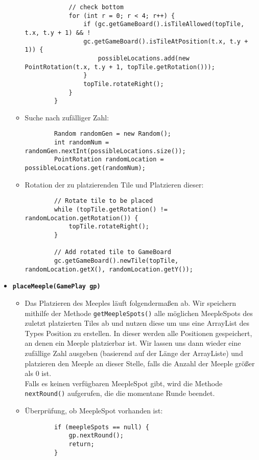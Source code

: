 \begin{itemize}
\begin{itemize}
\begin{lstlisting}
			// check bottom
			for (int r = 0; r < 4; r++) {
				if (gc.getGameBoard().isTileAllowed(topTile, t.x, t.y + 1) && !
				gc.getGameBoard().isTileAtPosition(t.x, t.y + 1)) {
					possibleLocations.add(new PointRotation(t.x, t.y + 1, topTile.getRotation()));
				}
				topTile.rotateRight();
			}
		}
	\end{lstlisting}
	
	\item Suche nach zufälliger Zahl:
	\begin{lstlisting}
		Random randomGen = new Random();
		int randomNum = randomGen.nextInt(possibleLocations.size());
		PointRotation randomLocation = possibleLocations.get(randomNum);
	\end{lstlisting}	
	
	\clearpage	
	
	\item Rotation der zu platzierenden Tile und Platzieren dieser:
	\begin{lstlisting}
		// Rotate tile to be placed
		while (topTile.getRotation() != randomLocation.getRotation()) {
			topTile.rotateRight();
		}
		
		// Add rotated tile to GameBoard
		gc.getGameBoard().newTile(topTile, randomLocation.getX(), randomLocation.getY());
	\end{lstlisting}
	
	\end{itemize}
\item \textbf{\texttt{placeMeeple(GamePlay gp)}}
	\begin{itemize}
	
	\item[]
			Das Platzieren des Meeples läuft folgendermaßen ab. Wir speichern mithilfe der Methode 
			\texttt{getMeepleSpots()} alle möglichen MeepleSpots des zuletzt platzierten Tiles ab und nutzen 
			diese um uns eine ArrayList des Types Position zu erstellen. In dieser werden alle Positionen
			gespeichert, an denen ein Meeple platzierbar ist. Wir lassen uns dann wieder eine zufällige Zahl
			ausgeben (basierend auf der Länge der ArrayListe) und platzieren den Meeple an dieser Stelle,
			falls die Anzahl der Meeple größer als 0 ist. \\
			Falls es keinen verfügbaren MeepleSpot gibt, wird die Methode \texttt{nextRound()} aufgerufen,
			die die momentane Runde beendet.
			
	\item Überprüfung, ob MeepleSpot vorhanden ist:
	\begin{lstlisting}
		if (meepleSpots == null) {
			gp.nextRound();
			return;
		}
	\end{lstlisting}
	

\end{itemize}
\end{itemize}
